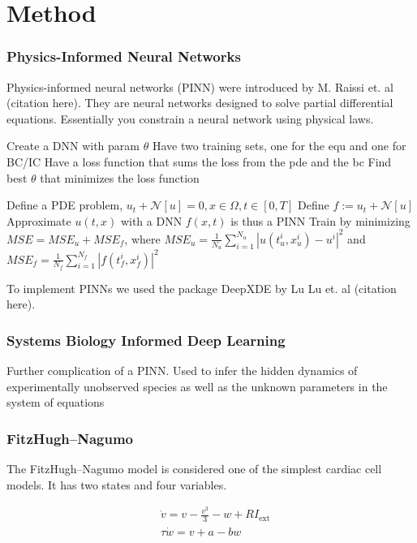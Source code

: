 \chapter{Method}
\label{sec:method}

\subsection{Physics-Informed Neural Networks}

Physics-informed neural networks (PINN) were introduced by M. Raissi et. al (citation here). 
They are neural networks designed to solve partial differential equations. 
Essentially you constrain a neural network using physical laws.

Create a DNN with param $\theta$
Have two training sets, one for the equ and one for BC/IC
Have a loss function that sums the loss from the pde and the bc
Find best $\theta$ that minimizes the loss function

Define a PDE problem, $u_{t}+\mathcal{N}[u]=0, x \in \Omega, t \in[0, T]$
Define $f:=u_{t}+\mathcal{N}[u]$
Approximate $u(t,x)$ with a DNN
$f(x,t)$ is thus a PINN 
Train by minimizing $M S E=M S E_{u}+M S E_{f}$, where $M S E_{u}=\frac{1}{N_{u}} \sum_{i=1}^{N_{u}}\left|u\left(t_{u}^{i}, x_{u}^{i}\right)-u^{i}\right|^{2}$ and $M S E_{f}=\frac{1}{N_{f}} \sum_{i=1}^{N_{f}}\left|f\left(t_{f}^{i}, x_{f}^{i}\right)\right|^{2}$

To implement PINNs we used the package DeepXDE by Lu Lu et. al (citation here). 


\subsection{Systems Biology Informed Deep Learning}

Further complication of a PINN. 
Used to infer the hidden dynamics of experimentally unobserved species as well as the unknown parameters in the system of equations


\subsection{FitzHugh–Nagumo}

The FitzHugh–Nagumo model is considered one of the simplest cardiac cell models. It has two states and four variables.

\begin{align}\label{eq:fhn}
    &\dot{v}=v-\frac{v^{3}}{3}-w+R I_{\mathrm{ext}} \\
    &\tau \dot{w}=v+a-b w
\end{align}



